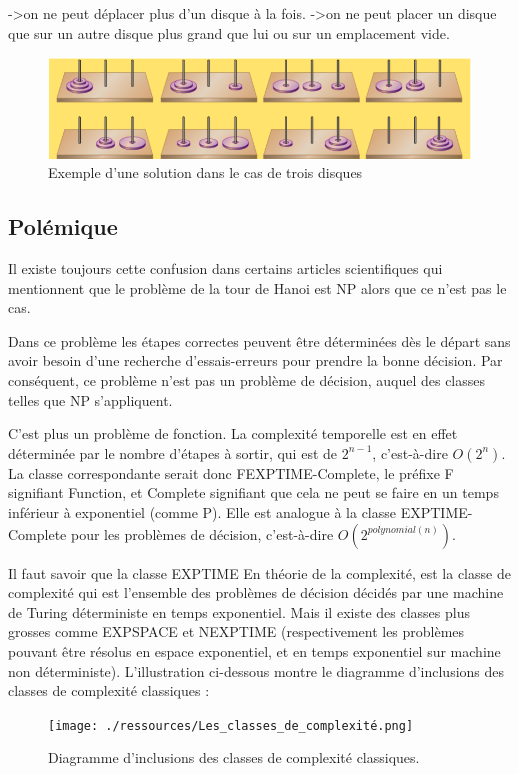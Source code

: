 ->on ne peut déplacer plus d'un disque à la fois.
->on ne peut placer un disque que sur un autre disque plus grand que lui ou sur un emplacement vide.

\begin{figure}[H]
    \centering
        \includegraphics[scale=0.5]{./ressources/Présentation_du_problème.png}
        \caption{Exemple d'une solution dans le cas de trois disques}
    \label{fig:representationProbleme}
\end{figure}

\subsection{Polémique}
Il existe toujours cette confusion dans certains articles scientifiques qui mentionnent que le problème de la tour de Hanoi est NP alors que ce n'est pas le cas.

Dans ce problème les étapes correctes peuvent être déterminées dès le départ sans avoir besoin d'une recherche d'essais-erreurs pour prendre la bonne décision. Par conséquent, ce problème n'est pas un problème de décision, auquel des classes telles que NP s'appliquent.

C'est plus un problème de fonction. La complexité temporelle est en effet déterminée par le nombre d'étapes à sortir, qui est de $2^{n-1}$, c'est-à-dire $O(2^n).$
La classe correspondante serait donc FEXPTIME-Complete, le préfixe F signifiant Function, et Complete signifiant que cela ne peut se faire en un temps inférieur à exponentiel (comme P). Elle est analogue à la classe EXPTIME-Complete pour les problèmes de décision, c'est-à-dire $O(2^{polynomial(n)})$.

Il faut savoir que la classe EXPTIME En théorie de la complexité, est la classe de complexité qui est l'ensemble des problèmes de décision décidés par une machine de Turing déterministe en temps exponentiel.  Mais il existe des classes plus grosses comme EXPSPACE et NEXPTIME (respectivement les problèmes pouvant être résolus en espace exponentiel, et en temps exponentiel sur machine non déterministe).
L'illustration ci-dessous montre le diagramme d'inclusions des classes de complexité classiques :
\begin{figure}[H]
    \centering
        \texttt{[image: ./ressources/Les\_classes\_de\_complexité.png]}
        \caption{Diagramme d'inclusions des classes de complexité classiques.}
    \label{fig:classeComplexite}
\end{figure}

